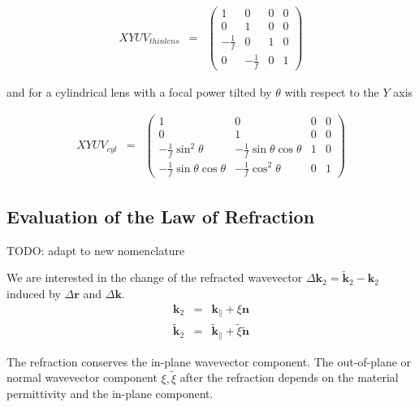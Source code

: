 \documentclass[12pt,a4paper,twoside,openright,BCOR10mm,headsepline,titlepage,abstracton,chapterprefix,final]{scrreprt}
\newcommand\Vector[1]{{\mathbf{#1}}}
\newcommand\wavenumber{k}
\newcommand\Wavevector{\Vector{\wavenumber}}
\begin{document}
\begin{eqnarray}
XYUV_{thin lens} &=&
 \begin{pmatrix}
  1 & 0 & 0 & 0 \\
  0 & 1 & 0 & 0 \\
  -\frac{1}{f} & 0 & 1 & 0 \\
  0 & -\frac{1}{f} & 0 & 1
 \end{pmatrix}
\end{eqnarray}

and for a cylindrical lens with a focal power tilted by $\theta$ with respect to the $Y$ axis

\begin{eqnarray}
XYUV_{cyl} &=&
 \begin{pmatrix}
  1 & 0 & 0 & 0 \\
  0 & 1 & 0 & 0 \\
  -\frac{1}{f} \sin^2\theta & -\frac{1}{f} \sin\theta \cos\theta & 1 & 0 \\
  -\frac{1}{f} \sin\theta \cos\theta & -\frac{1}{f} \cos^2\theta & 0 & 1
 \end{pmatrix}
\end{eqnarray}



\subsection{Evaluation of the Law of Refraction}



TODO: adapt to new nomenclature

We are interested in the change of the refracted wavevector $\Delta\Wavevector_2 = \tilde{\Wavevector}_2 - \Wavevector_2$ induced by $\Delta\Vector{r}$ and $\Delta\Wavevector$.
\begin{eqnarray}
 \Wavevector_2 &=& \Wavevector_{\parallel} + \xi \Vector{n} 
 \\
 \tilde{\Wavevector}_2 &=& \tilde{\Wavevector}_{\parallel} + \tilde{\xi} \tilde{\Vector{n}} 
\end{eqnarray}

The refraction conserves the in-plane wavevector component. 
The out-of-plane or normal wavevector component $\xi, \tilde{\xi}$ after the refraction depends on the material permittivity and the in-plane component.
\end{document}
